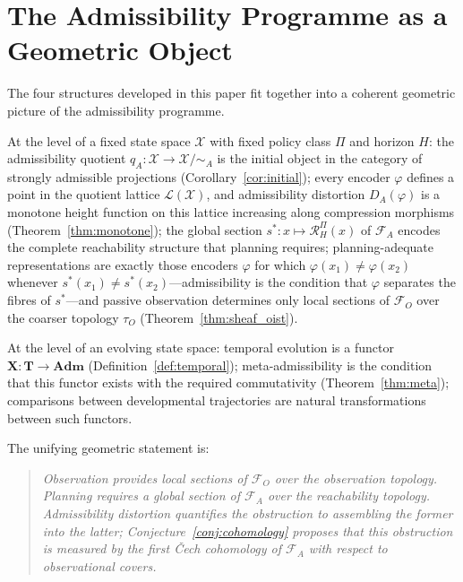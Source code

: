 \documentclass[11pt, a4paper]{article}
\theoremstyle{plain}
\theoremstyle{definition}
\theoremstyle{remark}
\newcommand{\calX}{\mathcal{X}}
\newcommand{\calF}{\mathcal{F}}
\newcommand{\calL}{\mathcal{L}}
\newcommand{\simA}{\sim_{\!A}}
\newcommand{\RHP}{\mathcal{R}_{H}^{\Pi}}
\newcommand{\DA}{D_{A}(\varphi)}
\newcommand{\XmodA}{\calX/{\simA}}
\newcommand{\Adm}{\mathbf{Adm}}
\begin{document}
\section{The Admissibility Programme as a Geometric Object}
\label{sec:synthesis}

The four structures developed in this paper fit together into a coherent
geometric picture of the admissibility programme.

At the level of a fixed state space $\calX$ with fixed policy class $\Pi$ and
horizon $H$: the admissibility quotient $q_A\colon \calX \to \XmodA$ is the
initial object in the category of strongly admissible projections
(Corollary~\ref{cor:initial}); every encoder $\varphi$ defines a point in
the quotient lattice $\calL(\calX)$, and admissibility distortion $\DA$ is a
monotone height function on this lattice increasing along compression morphisms
(Theorem~\ref{thm:monotone}); the global section $s^*\colon x \mapsto \RHP(x)$ of $\calF_A$ encodes
the complete reachability structure that planning requires; planning-adequate
representations are exactly those encoders $\varphi$ for which $\varphi(x_1)
\neq \varphi(x_2)$ whenever $s^*(x_1) \neq s^*(x_2)$---admissibility is
the condition that $\varphi$ separates the fibres of $s^*$---and
passive observation determines only local sections of $\calF_O$ over the
coarser topology $\tau_O$ (Theorem~\ref{thm:sheaf_oist}).

At the level of an evolving state space: temporal evolution is a functor
$\mathbf{X}\colon \mathbf{T} \to \Adm$ (Definition~\ref{def:temporal});
meta-admissibility is the condition that this functor exists with the required
commutativity (Theorem~\ref{thm:meta}); comparisons between developmental
trajectories are natural transformations between such functors.

The unifying geometric statement is:
\begin{quote}\itshape
Observation provides local sections of $\calF_O$ over the observation topology.
Planning requires a global section of $\calF_A$ over the reachability topology.
Admissibility distortion quantifies the obstruction to assembling the former
into the latter; Conjecture~\ref{conj:cohomology} proposes that this
obstruction is measured by the first \v{C}ech cohomology of $\calF_A$ with
respect to observational covers.
\end{quote}
\end{document}
